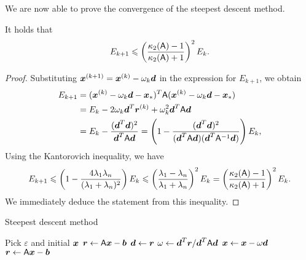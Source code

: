 We are now able to prove the convergence of the steepest descent method.
\begin{theorem}
    \label{theorem:linear_convergenec_steepest_descent}
    It holds that
    \[
        E_{k+1} \leqslant \left(\frac{\kappa_2(\mathsf A) - 1}{\kappa_2(\mathsf A) + 1}  \right)^2 E_k.
    \]
\end{theorem}
\begin{proof}
    Substituting $\mathbf{\boldsymbol{x}}^{(k+1)} = \mathbf{\boldsymbol{x}}^{(k)} - \omega_k \mathbf{\boldsymbol{d}}$ in the expression for $E_{k+1}$,
    we obtain
    \begin{align*}
        E_{k+1}
        &= (\mathbf{\boldsymbol{x}}^{(k)} - \omega_k \mathbf{\boldsymbol{d}} - \mathbf{\boldsymbol{x}}_*)^T \mathsf A (\mathbf{\boldsymbol{x}}^{(k)} - \omega_k \mathbf{\boldsymbol{d}} - \mathbf{\boldsymbol{x}}_*) \\
        &= E_k - 2 \omega_k \mathbf{\boldsymbol{d}}^T \mathbf{\boldsymbol{r}}^{(k)} + \omega_k^2 \mathbf{\boldsymbol{d}}^T \mathsf A \mathbf{\boldsymbol{d}} \\
        &=  E_k - \frac{(\mathbf{\boldsymbol{d}}^T \mathbf{\boldsymbol{d}})^2}{\mathbf{\boldsymbol{d}}^T \mathsf A \mathbf{\boldsymbol{d}}}
        =  \left( 1 - \frac{(\mathbf{\boldsymbol{d}}^T \mathbf{\boldsymbol{d}})^2}{(\mathbf{\boldsymbol{d}}^T \mathsf A \mathbf{\boldsymbol{d}}) (\mathbf{\boldsymbol{d}}^T \mathsf A^{-1} \mathbf{\boldsymbol{d}})} \right) E_k,
    \end{align*}
    Using the Kantorovich inequality,
    we have
    \begin{align*}
        E_{k+1}
        \leqslant \left( 1  - \frac{4 \lambda_1 \lambda_n}{(\lambda_1 + \lambda_n)^2}  \right) E_k
        \leqslant \left(\frac{\lambda_1 - \lambda_n}{\lambda_1 + \lambda_n}  \right)^2 E_k
        = \left(\frac{\kappa_2(\mathsf A) - 1}{\kappa_2(\mathsf A) + 1}  \right)^2 E_k.
    \end{align*}
    We immediately deduce the statement from this inequality.
\end{proof}

\begin{algorithm}
\caption{Steepest descent method}%
\label{algo:steepest_descent_method}%
\begin{algorithmic}[1]
\State Pick $\varepsilon$ and initial $\mathbf{\boldsymbol{x}}$%
\State $\mathbf{\boldsymbol{r}} \gets \mathsf A \mathbf{\boldsymbol{x}} - \mathbf{\boldsymbol{b}}$%
    \State $\mathbf{\boldsymbol{d}} \gets \mathbf{\boldsymbol{r}}$
    \State $\omega \gets \mathbf{\boldsymbol{d}}^T \mathbf{\boldsymbol{r}}/\mathbf{\boldsymbol{d}}^T \mathsf A \mathbf{\boldsymbol{d}}$
    \State $\mathbf{\boldsymbol{x}} \gets \mathbf{\boldsymbol{x}} - \omega \mathbf{\boldsymbol{d}}$
    \State $\mathbf{\boldsymbol{r}} \gets \mathsf A \mathbf{\boldsymbol{x}} - \mathbf{\boldsymbol{b}}$
\EndWhile
\end{algorithmic}
\end{algorithm}

